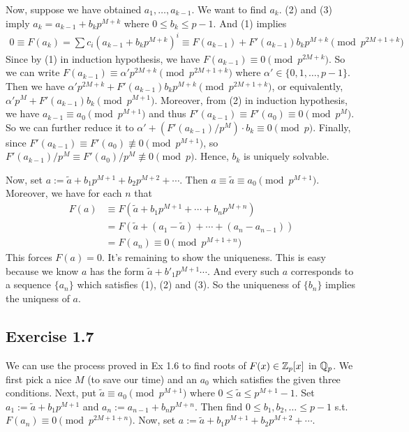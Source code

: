 \documentclass[../Koblitz.tex]{subfiles}
\begin{document}
Now, suppose we have obtained $a_1,\ldots,a_{k-1}$. We want to find $a_k$. (2) and (3) imply $a_k=a_{k-1}+b_kp^{M+k}$ where $0\leq b_k\leq p-1$. And (1) implies
\begin{align*}
0\equiv F(a_k) = \sum c_i\left(a_{k-1}+b_kp^{M+k}\right)^i \equiv F(a_{k-1})+F'(a_{k-1})b_kp^{M+k} \pmod{p^{2M+1+k}}
\end{align*}
Since by (1) in induction hypothesis, we have $F(a_{k-1})\equiv 0 \pmod{p^{2M+k}}$. So we can write $F(a_{k-1}) \equiv \alpha'p^{2M+k} \pmod{p^{2M+1+k}}$ where
$\alpha'\in\{0,1,\ldots,p-1\}$. Then we have $\alpha'p^{2M+k}+F'(a_{k-1})b_kp^{M+k} \pmod{p^{2M+1+k}}$, or equivalently, $\alpha'p^M+F'(a_{k-1})b_k \pmod{p^{M+1}}$. Moreover, from (2) in induction hypothesis, we have $a_{k-1}\equiv a_0 \pmod{p^{M+1}}$ and thus $F'(a_{k-1})\equiv F'(a_0)\equiv 0 \pmod{p^M}$. So we can further reduce it to $\alpha'+(F'(a_{k-1})/p^M)\cdot b_k \equiv 0\pmod{p}$. Finally, since $F'(a_{k-1})\equiv F'(a_0)\not\equiv 0 \pmod{p^{M+1}}$, so $F'(a_{k-1})/p^M \equiv F'(a_0)/p^M\not\equiv 0 \pmod{p}$. Hence, $b_k$ is uniquely solvable.

Now, set $a:=\tilde{a}+b_1p^{M+1}+b_2p^{M+2}+\cdots$. Then $a\equiv \tilde{a} \equiv a_0\pmod{p^{M+1}}$. Moreover, we have for each $n$ that
\begin{align*}
F(a) &\equiv F(\tilde{a}+b_1p^{M+1}+\cdots+b_np^{M+n}) \\
&= F(\tilde{a}+(a_1-\tilde{a})+\cdots+(a_n-a_{n-1})) \\
&= F(a_n) \equiv 0 \pmod{p^{M+1+n}}
\end{align*}
This forces $F(a)=0$. It's remaining to show the uniqueness. This is easy because we know $a$ has the form $\tilde{a}+b'_1p^{M+1}\cdots$. And every such $a$ corresponds to a sequence $\{a_n\}$ which satisfies (1), (2) and (3). So the uniqueness of $\{b_n\}$ implies the uniqness of $a$.

\subsection*{Exercise 1.7}

We can use the process proved in Ex 1.6 to find roots of $F(x)\in\mathbb{Z}_p[x]$ in $\mathbb{Q}_p$. We first pick a nice $M$ (to save our time) and an $a_0$ which satisfies the given three conditions. Next, put $\tilde{a}\equiv a_0 \pmod{p^{M+1}}$ where $0\leq \tilde{a} \leq p^{M+1}-1$. Set $a_1:=\tilde{a}+b_1p^{M+1}$ and $a_n:=a_{n-1}+b_np^{M+n}$. Then find $0\leq b_1,b_2,\ldots \leq p-1$ s.t. $F(a_n)\equiv 0\pmod{p^{2M+1+n}}$. Now, set $a:=\tilde{a}+b_1p^{M+1}+b_2p^{M+2}+\cdots$.
\end{document}
